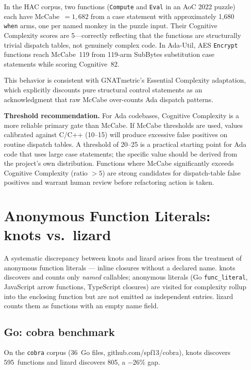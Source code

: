 \documentclass[10pt,twocolumn,letterpaper]{article}
\begin{document}
In the HAC corpus, two functions (\texttt{Compute} and \texttt{Eval} in
an AoC 2022 puzzle) each have McCabe~$= 1{,}682$ from a case statement
with approximately 1{,}680 \texttt{when} arms, one per named monkey in the
puzzle input.  Their Cognitive Complexity scores are 5---correctly
reflecting that the functions are structurally trivial dispatch tables,
not genuinely complex code.  In Ada-Util, AES \texttt{Encrypt} functions
reach McCabe~119 from 119-arm SubBytes substitution case statements while
scoring Cognitive~82.

This behavior is consistent with GNATmetric's Essential Complexity
adaptation, which explicitly discounts pure structural control statements
as an acknowledgment that raw McCabe over-counts Ada dispatch patterns.

\textbf{Threshold recommendation.}  For Ada codebases, Cognitive
Complexity is a more reliable primary gate than McCabe.  If McCabe
thresholds are used, values calibrated against C/C++ (10--15) will produce
excessive false positives on routine dispatch tables.  A threshold of 20--25
is a practical starting point for Ada code that uses large case statements;
the specific value should be derived from the project's own distribution.
Functions where McCabe significantly exceeds Cognitive Complexity (ratio
$> 5$) are strong candidates for dispatch-table false positives and warrant
human review before refactoring action is taken.

\section{Anonymous Function Literals: knots vs.\ lizard}
\label{sec:anon-fns}

A systematic discrepancy between knots and lizard arises from the treatment
of anonymous function literals --- inline closures without a declared name.
knots discovers and counts only \emph{named} callables; anonymous literals
(Go \texttt{func\_literal}, JavaScript arrow functions, TypeScript closures)
are visited for complexity rollup into the enclosing function but are not
emitted as independent entries.  lizard counts them as functions with an
empty name field.

\subsection{Go: cobra benchmark}

On the \texttt{cobra} corpus (36~Go files, github.com/spf13/cobra), knots
discovers 595~functions and lizard discovers 805, a $-26\%$ gap.
\end{document}
